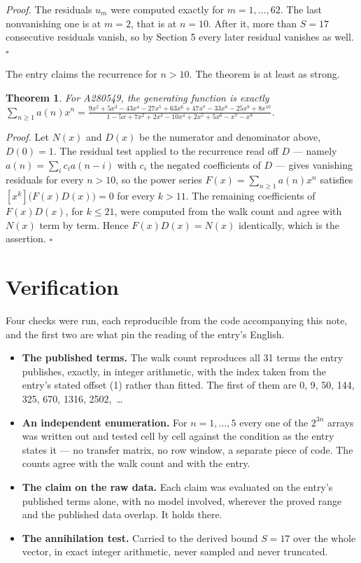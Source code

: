\documentclass[11pt]{article}
\newtheorem{theorem}{Theorem}
\theoremstyle{definition}
\begin{document}
{\itshape Proof.} The residuals $u_m$ were computed exactly for $m = 1,\dots,62$. The last nonvanishing one is at $m = 2$, that is at $n = 10$. After it, more than $S = 17$ consecutive residuals vanish, so by Section 5 every later residual vanishes as well. $\square$

The entry claims the recurrence for $n > 10$. The theorem is at least as strong.

\begin{theorem} For A280549, the generating function is exactly $\sum_{n\ge 1} a(n)x^n = \frac{9x^{2} + 5x^{3} - 43x^{4} - 27x^{5} + 63x^{6} + 47x^{7} - 33x^{8} - 25x^{9} + 8x^{10}}{1 - 5x + 7x^{2} + 2x^{3} - 10x^{4} + 2x^{5} + 5x^{6} - x^{7} - x^{8}}$.\end{theorem}

{\itshape Proof.} Let $N(x)$ and $D(x)$ be the numerator and denominator above, $D(0)=1$. The residual test applied to the recurrence read off $D$ --- namely $a(n) = \sum_i c_i a(n-i)$ with $c_i$ the negated coefficients of $D$ --- gives vanishing residuals for every $n > 10$, so the power series $F(x)=\sum_{n\ge 1}a(n)x^n$ satisfies $[x^k]\bigl(F(x)D(x)\bigr) = 0$ for every $k > 11$. The remaining coefficients of $F(x)D(x)$, for $k \le 21$, were computed from the walk count and agree with $N(x)$ term by term. Hence $F(x)D(x) = N(x)$ identically, which is the assertion. $\square$

\section{Verification}

Four checks were run, each reproducible from the code accompanying this note, and the first two are what pin the reading of the entry's English.

\begin{itemize}

\item {\bfseries The published terms.} The walk count reproduces all 31 terms the entry publishes, exactly, in integer arithmetic, with the index taken from the entry's stated offset (1) rather than fitted. The first of them are 0, 9, 50, 144, 325, 670, 1316, 2502,~\dots

\item {\bfseries An independent enumeration.} For $n = 1,\dots,5$ every one of the $2^{3n}$ arrays was written out and tested cell by cell against the condition as the entry states it --- no transfer matrix, no row window, a separate piece of code. The counts agree with the walk count and with the entry.

\item {\bfseries The claim on the raw data.} Each claim was evaluated on the entry's published terms alone, with no model involved, wherever the proved range and the published data overlap. It holds there.

\item {\bfseries The annihilation test.} Carried to the derived bound $S = 17$ over the whole vector, in exact integer arithmetic, never sampled and never truncated.

\end{itemize}
\end{document}
